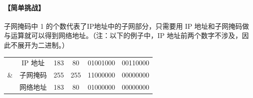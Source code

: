 \documentclass[UTF8]{ctexart}
\newcommand\col[1]{\textcolor{green!50!black}{#1}}
\newcommand\dotting{\ .\ }
\newcommand\Emph[1]{\colorbox{green!10}{\textcolor{green!30!black}{#1}}}
\begin{document}
\newpage
{}
\BgThispage

\paragraph{【简单挑战】} 子网掩码中 1 的个数代表了IP地址中的子网部分，只需要用 IP 地址和子网掩码做\Emph{与运算}就可以得到网络地址。\textcolor{note}{（注：以下的例子中，IP 地址前两个数字不涉及，因此不展开为二进制。）}

\begin{table}[H]
    \centering
    \begin{tabular}{ccc@{\dotting}c@{\dotting}c@{\dotting}c}
         & IP 地址 & 183 & 80 & 01001000 & 00110000 \\
      \& & 子网掩码 & \col{255} & \col{255} & \col{11}000000 & 00000000 \\
    \hline
         & 网络地址 & \col{183} & \col{80} & \col{01}000000 & 00000000 \\
    \end{tabular}
\end{table}
\end{document}
